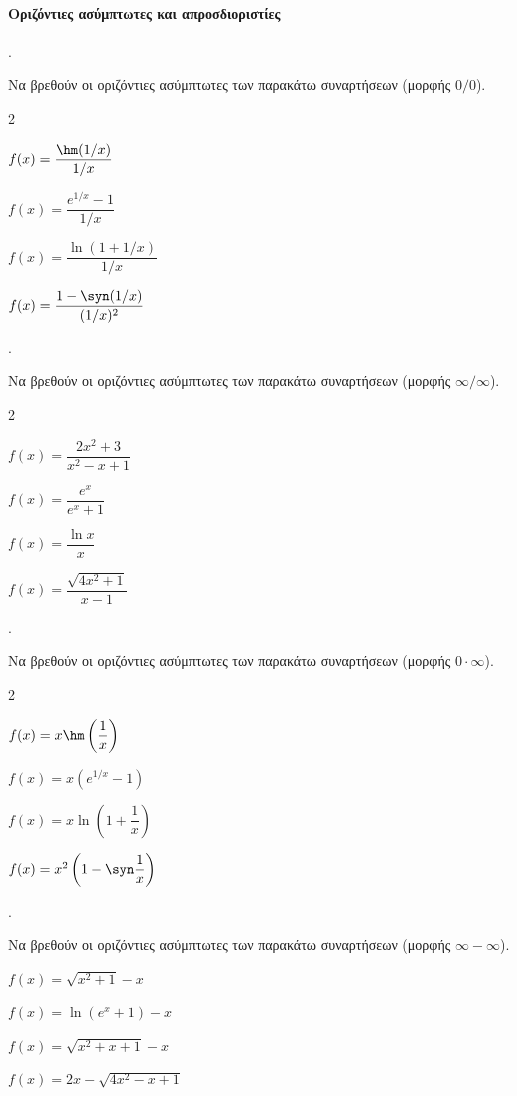 \documentclass[11pt,a4paper,twocolumn]{article}
\newcounter{askhsh}
\newcommand{\askhsh}{\large\theaskhsh.\ \addtocounter{askhsh}{1}}
\begin{document}
\paragraph{Οριζόντιες ασύμπτωτες και απροσδιοριστίες}
\askhsh Να βρεθούν οι οριζόντιες ασύμπτωτες των παρακάτω συναρτήσεων (μορφής $0/0$).
\begin{multicols}{2}
\begin{alist}
\item $f(x)=\dfrac{\hm(1/x)}{1/x}$
\item $f(x)=\dfrac{e^{1/x}-1}{1/x}$
\item $f(x)=\dfrac{\ln(1+1/x)}{1/x}$
\item $f(x)=\dfrac{1-\syn(1/x)}{(1/x)^2}$
\end{alist}
\end{multicols}
\askhsh Να βρεθούν οι οριζόντιες ασύμπτωτες των παρακάτω συναρτήσεων (μορφής $\infty/\infty$).
\begin{multicols}{2}
\begin{alist}
\item $f(x)=\dfrac{2x^2+3}{x^2-x+1}$
\item $f(x)=\dfrac{e^x}{e^x+1}$
\item $f(x)=\dfrac{\ln x}{x}$
\item $f(x)=\dfrac{\sqrt{4x^2+1}}{x-1}$
\end{alist}
\end{multicols}
\askhsh Να βρεθούν οι οριζόντιες ασύμπτωτες των παρακάτω συναρτήσεων (μορφής $0 \cdot \infty$).
\begin{multicols}{2}
\begin{alist}
\item $f(x)=x \hm\left(\dfrac{1}{x}\right)$
\item $f(x)=x \left(e^{1/x}-1\right)$
\item $f(x)=x \ln\left(1+\dfrac{1}{x}\right)$
\item $f(x)=x^2 \left(1-\syn\dfrac{1}{x}\right)$
\end{alist}
\end{multicols}
\askhsh Να βρεθούν οι οριζόντιες ασύμπτωτες των παρακάτω συναρτήσεων (μορφής $\infty-\infty$).
\begin{alist}
\item $f(x)=\sqrt{x^2+1}-x$
\item $f(x)=\ln(e^x+1)-x$
\item $f(x)=\sqrt{x^2+x+1}-x$
\item $f(x)=2x-\sqrt{4x^2-x+1}$
\end{alist}
\end{document}
